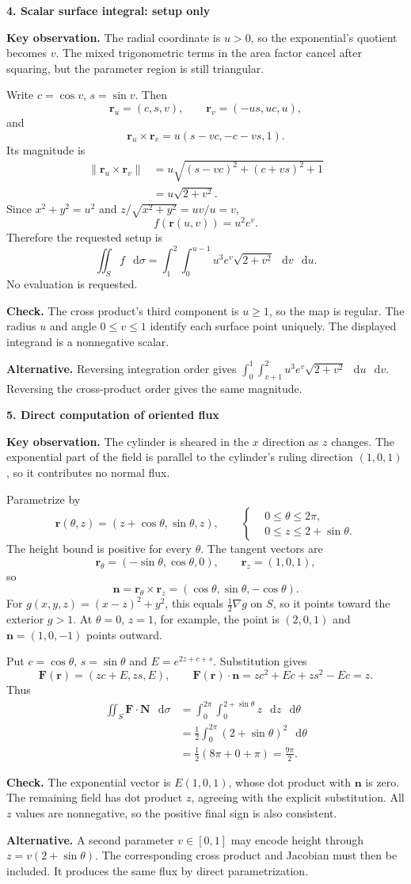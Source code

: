 \documentclass[11pt,letterpaper]{article}
\renewcommand{\vec}[1]{\mathbf{#1}}
\newcommand{\dd}{\mathop{}\!\mathrm{d}}
\newcommand{\grad}{\nabla}
\newcommand{\solutionproblem}[3]{%
  \par\bigskip\Needspace{7\baselineskip}
  \noindent\textbf{#1. #2}\par\nobreak
}
\newcommand{\insight}[1]{\par\textbf{Key observation.} #1\par}
\newcommand{\verification}[1]{\par\textbf{Check.} #1\par}
\newcommand{\alternative}[1]{\par\textbf{Alternative.} #1\par}
\begin{document}
\solutionproblem{4}{Scalar surface integral: setup only}{12}
\insight{The radial coordinate is $u>0$, so the exponential's quotient
becomes $v$. The mixed trigonometric terms in the area factor cancel
after squaring, but the parameter region is still triangular.}
Write $c=\cos v$, $s=\sin v$. Then
\[
\vec r_u=(c,s,v),\qquad \vec r_v=(-us,uc,u),
\]
and
\[
\vec r_u\times\vec r_v
=u(s-vc,-c-vs,1).
\]
Its magnitude is
\[
\begin{aligned}
\|\vec r_u\times\vec r_v\|
&=u\sqrt{(s-vc)^2+(c+vs)^2+1}\\
&=u\sqrt{2+v^2}.
\end{aligned}
\]
Since $x^2+y^2=u^2$ and $z/\sqrt{x^2+y^2}=uv/u=v$,
\[
f(\vec r(u,v))=u^2e^v.
\]
Therefore the requested setup is
\[
\boxed{\iint_S f\,\dd\sigma
=\int_1^2\int_0^{u-1}u^3e^v\sqrt{2+v^2}\,\dd v\,\dd u}.
\]
No evaluation is requested.
\verification{The cross product's third component is $u\geq1$, so the
map is regular. The radius $u$ and angle $0\leq v\leq1$ identify each
surface point uniquely. The displayed integrand is a nonnegative scalar.}
\alternative{Reversing integration order gives
$\int_0^1\int_{v+1}^2 u^3e^v\sqrt{2+v^2}\,\dd u\,\dd v$.
Reversing the cross-product order gives the same magnitude.}

\solutionproblem{5}{Direct computation of oriented flux}{20}
\insight{The cylinder is sheared in the $x$ direction as $z$ changes.
The exponential part of the field is parallel to the cylinder's ruling
direction $(1,0,1)$, so it contributes no normal flux.}
Parametrize by
\[
\vec r(\theta,z)=(z+\cos\theta,\sin\theta,z),\qquad
\left\{\begin{aligned}
&0\leq\theta\leq2\pi,\\
&0\leq z\leq2+\sin\theta.
\end{aligned}\right.
\]
The height bound is positive for every $\theta$. The tangent vectors are
\[
\vec r_\theta=(-\sin\theta,\cos\theta,0),\qquad
\vec r_z=(1,0,1),
\]
so
\[
\vec n=\vec r_\theta\times\vec r_z
=(\cos\theta,\sin\theta,-\cos\theta).
\]
For $g(x,y,z)=(x-z)^2+y^2$, this equals $\tfrac12\grad g$ on $S$,
so it points toward the exterior $g>1$. At $\theta=0$, $z=1$, for
example, the point is $(2,0,1)$ and $\vec n=(1,0,-1)$ points outward.

Put $c=\cos\theta$, $s=\sin\theta$ and $E=e^{2z+c+s}$. Substitution gives
\[
\vec F(\vec r)=(zc+E,zs,E),\qquad
\vec F(\vec r)\cdot\vec n
=zc^2+Ec+zs^2-Ec=z.
\]
Thus
\[
\begin{aligned}
\iint_S\vec F\cdot\vec N\,\dd\sigma
&=\int_0^{2\pi}\int_0^{2+\sin\theta}z\,\dd z\,\dd\theta\\
&=\frac12\int_0^{2\pi}(2+\sin\theta)^2\,\dd\theta\\
&=\frac12(8\pi+0+\pi)=\boxed{\frac{9\pi}{2}}.
\end{aligned}
\]
\verification{The exponential vector is $E(1,0,1)$, whose dot product
with $\vec n$ is zero. The remaining field has dot product $z$, agreeing
with the explicit substitution. All $z$ values are nonnegative, so the
positive final sign is also consistent.}
\alternative{A second parameter $v\in[0,1]$ may encode height through
$z=v(2+\sin\theta)$. The corresponding cross product and Jacobian must
then be included. It produces the same flux by direct parametrization.}
\end{document}

